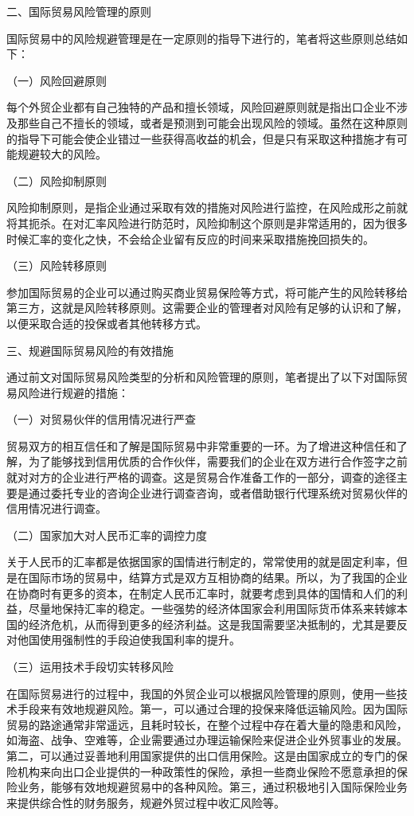 二、国际贸易风险管理的原则

国际贸易中的风险规避管理是在一定原则的指导下进行的，笔者将这些原则总结如下：

（一）风险回避原则

每个外贸企业都有自己独特的产品和擅长领域，风险回避原则就是指出口企业不涉及那些自己不擅长的领域，或者是预测到可能会出现风险的领域。虽然在这种原则的指导下可能会使企业错过一些获得高收益的机会，但是只有采取这种措施才有可能规避较大的风险。

（二）风险抑制原则

风险抑制原则，是指企业通过采取有效的措施对风险进行监控，在风险成形之前就将其扼杀。在对汇率风险进行防范时，风险抑制这个原则是非常适用的，因为很多时候汇率的变化之快，不会给企业留有反应的时间来采取措施挽回损失的。

（三）风险转移原则

参加国际贸易的企业可以通过购买商业贸易保险等方式，将可能产生的风险转移给第三方，这就是风险转移原则。这需要企业的管理者对风险有足够的认识和了解，以便采取合适的投保或者其他转移方式。

三、规避国际贸易风险的有效措施

通过前文对国际贸易风险类型的分析和风险管理的原则，笔者提出了以下对国际贸易风险进行规避的措施：

（一）对贸易伙伴的信用情况进行严查

贸易双方的相互信任和了解是国际贸易中非常重要的一环。为了增进这种信任和了解，为了能够找到信用优质的合作伙伴，需要我们的企业在双方进行合作签字之前就对对方的企业进行严格的调查。这是贸易合作准备工作的一部分，调查的途径主要是通过委托专业的咨询企业进行调查咨询，或者借助银行代理系统对贸易伙伴的信用情况进行调查。

（二）国家加大对人民币汇率的调控力度

关于人民币的汇率都是依据国家的国情进行制定的，常常使用的就是固定利率，但是在国际市场的贸易中，结算方式是双方互相协商的结果。所以，为了我国的企业在协商时有更多的资本，在制定人民币汇率时，就要考虑到具体的国情和人们的利益，尽量地保持汇率的稳定。一些强势的经济体国家会利用国际货币体系来转嫁本国的经济危机，从而得到更多的经济利益。这是我国需要坚决抵制的，尤其是要反对他国使用强制性的手段迫使我国利率的提升。

（三）运用技术手段切实转移风险

在国际贸易进行的过程中，我国的外贸企业可以根据风险管理的原则，使用一些技术手段来有效地规避风险。第一，可以通过合理的投保来降低运输风险。因为国际贸易的路途通常非常遥远，且耗时较长，在整个过程中存在着大量的隐患和风险，如海盗、战争、空难等，企业需要通过办理运输保险来促进企业外贸事业的发展。第二，可以通过妥善地利用国家提供的出口信用保险。这是由国家成立的专门的保险机构来向出口企业提供的一种政策性的保险，承担一些商业保险不愿意承担的保险业务，能够有效地规避贸易中的各种风险。第三，通过积极地引入国际保险业务来提供综合性的财务服务，规避外贸过程中收汇风险等。

